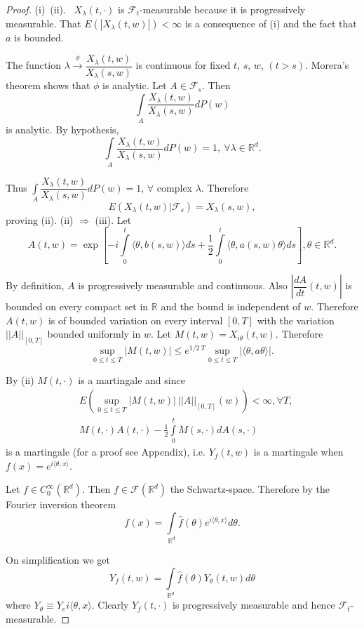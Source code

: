 \begin{proof}
(i)\ (ii).~ $X_{\lambda}(t,\cdot)$ is $\mathscr{F}_{t}$-measurable
  because it is progressively measurable. That
  $E(|X_{\lambda}(t,w)|)<\infty$ is a consequence of (i) and the fact
  that $a$ is bounded.

The function
$\lambda\xrightarrow{\phi}\dfrac{X_{\lambda}(t,w)}{X_{\lambda}(s,w)}$
is continuous for fixed $t$, $s$, $w$, $(t>s)$. Morera's theorem shows
that $\phi$ is analytic. Let $A\in \mathscr{F}_{s}$. Then
$$
\int\limits_{A}\frac{X_{\lambda}(t,w)}{X_{\lambda}(s,w)}dP(w)
$$\pageoriginale
is analytic. By hypothesis,
$$
\int\limits_{A}\frac{X_{\lambda}(t,w)}{X_{\lambda}(s,w)}dP(w)=1,\ \forall
\lambda \in \mathbb{R}^{d}.
$$

Thus
$\int\limits_{A}\dfrac{X_{\lambda}(t,w)}{X_{\lambda}(s,w)}dP(w)=1$,
$\forall$ complex $\lambda$. Therefore
$$
E(X_{\lambda}(t,w)|\mathscr{F}_{s})=X_{\lambda}(s,w),
$$
proving
(ii). (ii) $\Rightarrow$ (iii). Let
$$
A(t,w)=\exp\left[-i\int\limits^{t}_{0}\langle \theta, b(s,w)\rangle
  ds+\frac{1}{2}\int\limits^{t}_{0}\langle \theta, a(s,w)\theta\rangle
  ds\right],\theta\in \mathbb{R}^{d}.
$$

By definition, $A$ is progressively measurable and continuous. Also
$|\dfrac{dA}{dt}(t,w)|$ is bounded on every compact set in
$\mathbb{R}$ and the bound is independent of $w$. Therefore $A(t,w)$
is of bounded variation on every interval $[0,T]$ with the variation
$||A||_{[0,T]}$ bounded uniformly in $w$. Let
$M(t,w)=X_{i\theta}(t,w)$. Therefore
$$
\sup\limits_{0\leq t\leq T}|M(t,w)|\leq e^{1/2\ T}\sup\limits_{0\leq
  t\leq T}|\langle\theta,a\theta\rangle|.
$$

By (ii) $M(t,\cdot)$ is a martingale and since
\begin{align*}
& E\left(\sup\limits_{0\leq t\leq
  T}|M(t,w)|~||A||_{[0,T]}(w)\right)<\infty, \forall T,\\
& M(t,\cdot)A(t,\cdot)-\frac{1}{2}\int\limits^{t}_{0}M(s,\cdot)dA(s,\cdot)
\end{align*}
is a martingale (for a proof see Appendix), i.e. $Y_{f}(t,w)$ is a
martingale when $f(x)=e^{i\langle \theta,x\rangle}$.

Let $f\in C^{\infty}_{0}(\mathbb{R}^{d})$. Then $f\in
\mathscr{F}(\mathbb{R}^{d})$ the Schwartz-space. Therefore by the
Fourier inversion theorem
$$
f(x)=\int\limits_{\mathbb{R}^{d}}\hat{f}(\theta)e^{i\langle
  \theta,x\rangle}d\theta. 
$$\pageoriginale

On simplification we get
$$
Y_{f}(t,w)=\int\limits_{\mathbb{R}^{d}}\hat{f}(\theta)Y_{\theta}(t,w)d\theta
$$
where $Y_{\theta}\equiv Y_{e}i\langle \theta,x\rangle$. Clearly
$Y_{f}(t,\cdot)$ is progressively measurable and hence
$\mathscr{F}_{t}$-measurable. 


\end{proof}
